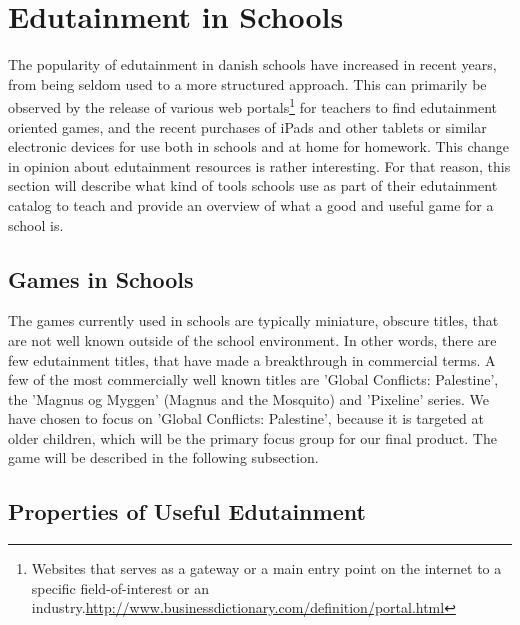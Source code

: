 \section{Edutainment in Schools}
\label{sec:eduinsch}
The popularity of edutainment in danish schools have increased in recent years, from being seldom used to a more structured approach. 
This can primarily be observed by the release of various web portals\footnote{Websites that serves as a gateway or a main entry point on the internet to a specific field-of-interest or an industry.\url{http://www.businessdictionary.com/definition/portal.html}} for teachers to find edutainment oriented games, and the recent purchases of iPads and other tablets or similar electronic devices for use both in schools and at home for homework.
This change in opinion about edutainment resources is rather interesting. For that reason, this section will describe what kind of tools schools use as part of their edutainment catalog to teach and provide an overview of what a good and useful game for a school is.


\subsection{Games in Schools}

The games currently used in schools are typically miniature, obscure titles, that are not well known outside of the school environment.
In other words, there are few edutainment titles, that have made a breakthrough in commercial terms.
A few of the most commercially well known titles are 'Global Conflicts: Palestine', the 'Magnus og Myggen' (Magnus and the Mosquito) and 'Pixeline' series.
We have chosen to focus on 'Global Conflicts: Palestine', because it is targeted at older children, which will be the primary focus group for our final product. The game will be described in the following subsection.

\subsection{Properties of Useful Edutainment}

